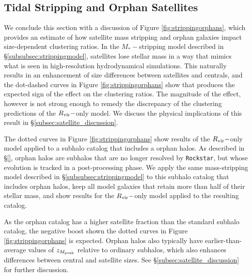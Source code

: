 \documentclass[usenatbib,usegraphicx,letterpaper]{mn2e}
\newcommand{\mstar}{M_{\ast}}
\newcommand{\zpeak}{z_{M_{\rm peak}}}
\newcommand{\rvir}{R_{\rm vir}}
\begin{document}
\subsection{Tidal Stripping and Orphan Satellites}
\label{subsec:orphan_stripping}

We conclude this section with a discussion of Figure \ref{fig:strippingorphans}, which provides an estimate of how satellite mass stripping and orphan galaxies impact size-dependent clustering ratios. In the $\mstar-$stripping model described in \S\ref{subsubsec:strippingmodel}, satellites lose stellar mass in a way that mimics what is seen in high-resolution hydrodynamical simulations. This naturally results in an enhancement of size differences between satellites and centrals, and the dot-dashed curves in Figure \ref{fig:strippingorphans} show that produces the expected sign of the effect on the clustering ratios. The magnitude of the effect, however is not strong enough to remedy the discrepancy of the clustering predictions of the $\rvir-$only model. We discuss the physical implications of this result in \S\ref{subsec:satellite_discussion}.

The dotted curves in Figure \ref{fig:strippingorphans} show results of the $\rvir-$only model applied to a subhalo catalog that includes a orphan halos. As described in \S\ref{}, orphan halos are subhalos that are no longer resolved by {\tt Rockstar}, but whose evolution is tracked in a post-processing phase. We apply the same mass-stripping model described in \S\ref{subsubsec:strippingmodel} to this subhalo catalog that includes orphan halos, keep all model galaxies that retain more than half of their stellar mass, and show results for the $\rvir-$only model applied to the resulting catalog.

As the orphan catalog has a higher satellite fraction than the standard subhalo catalog, the negative boost shown the dotted curves in Figure \ref{fig:strippingorphans} is expected. Orphan halos also typically have earlier-than-average values of $\zpeak$ relative to ordinary subhalos, which also enhances differences between central and satellite sizes. See \S\ref{subsec:satellite_discussion} for further discussion.
\end{document}
